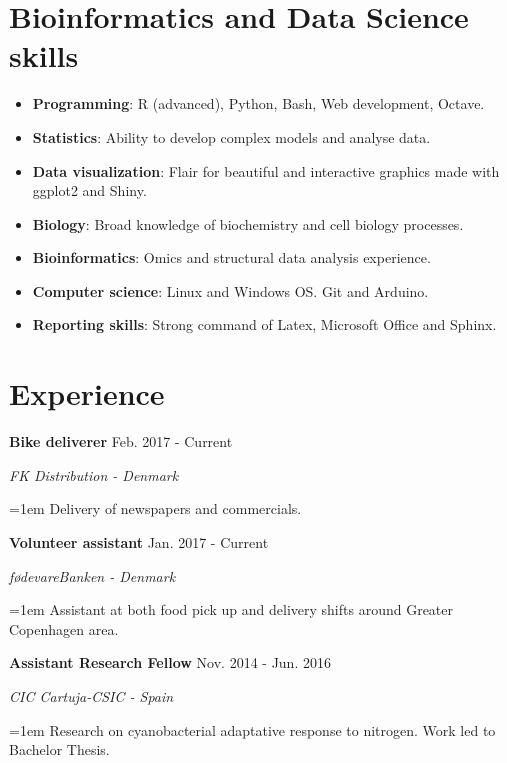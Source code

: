 \documentclass[paper=a4,fontsize=11pt]{article}
\newcommand{\NewPart}[1]{\section*{
{#1}}}
\newcommand{\Entry}[4]{
		\noindent \textbf{#1} \hfill      %
		\textsf{#2} \par                  %
		\noindent \textit{#3} \par        %
		  \noindent\hangindent=1em\hangafter=0 \small #4  %
		\normalsize \par \vspace{7.5pt}}
\begin{document}




\NewPart{Bioinformatics and Data Science skills}

\begin{itemize}
\item \textbf{Programming}: R (advanced), Python, Bash, Web development, Octave.
\item \textbf{Statistics}: Ability to develop complex models and analyse data.
\item \textbf{Data visualization}: Flair for beautiful and interactive graphics made with ggplot2 and Shiny.
\item \textbf{Biology}: Broad knowledge of biochemistry and cell biology processes.
\item \textbf{Bioinformatics}: Omics and structural data analysis experience.
\item \textbf{Computer science}: Linux and Windows OS. Git and Arduino.
\item \textbf{Reporting skills}: Strong command of Latex, Microsoft Office and Sphinx.
\end{itemize}


\NewPart{Experience}{}

\Entry{Bike deliverer}{Feb. 2017 - Current}{FK Distribution - Denmark}{Delivery of newspapers and commercials.}


\Entry{Volunteer assistant}{Jan. 2017 - Current}{f{\o}devareBanken - Denmark}{Assistant at both food pick up and delivery shifts around Greater Copenhagen area.}

\Entry{Assistant Research Fellow}{Nov. 2014 - Jun. 2016}{CIC Cartuja-CSIC  - Spain}{Research on cyanobacterial adaptative response to nitrogen. Work led to Bachelor Thesis.}

\end{document}
